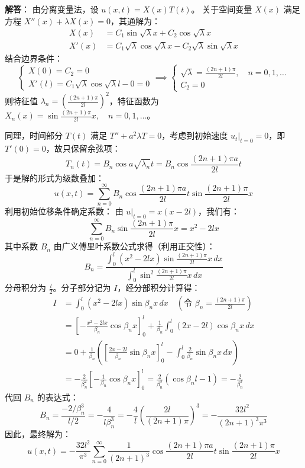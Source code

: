 \documentclass[12pt,a4paper]{ctexart}
\begin{document}
	\textbf{解答}：
	由分离变量法，设 $u(x,t) = X(x)T(t)$。
	关于空间变量 $X(x)$ 满足方程 $X''(x) + \lambda X(x) = 0$，其通解为：
	\begin{align*}
		X(x) &= C_1 \sin \sqrt{\lambda}x + C_2 \cos \sqrt{\lambda}x \\
		X'(x) &= C_1 \sqrt{\lambda} \cos \sqrt{\lambda}x - C_2 \sqrt{\lambda} \sin \sqrt{\lambda}x
	\end{align*}
	结合边界条件：
	\begin{equation}
		\begin{cases}
			X(0) = C_2 = 0 \\
			X'(l) = C_1 \sqrt{\lambda} \cos \sqrt{\lambda}l - 0 = 0
		\end{cases}
		\implies
		\begin{cases}
			\sqrt{\lambda} = \frac{(2n+1)\pi}{2l}, \quad n=0, 1, \dots \\
			C_2 = 0
		\end{cases}
	\end{equation}
	则特征值 $\lambda_n = \left(\frac{(2n+1)\pi}{2l}\right)^2$，特征函数为 $X_n(x) = \sin \frac{(2n+1)\pi}{2l}x, \quad n=0, 1, \dots$。
	
	同理，时间部分 $T(t)$ 满足 $T'' + a^2\lambda T = 0$，考虑到初始速度 $u_t|_{t=0} = 0$，即 $T'(0)=0$，故只保留余弦项：
	\[
	T_n(t) = B_n \cos a\sqrt{\lambda_n}t = B_n \cos \frac{(2n+1)\pi a}{2l}t
	\]
	于是解的形式为级数叠加：
	\[
	u(x, t) = \sum_{n=0}^{\infty} B_n \cos \frac{(2n+1)\pi a}{2l}t \sin \frac{(2n+1)\pi}{2l}x
	\]
	利用初始位移条件确定系数：
	由 $u|_{t=0} = x(x - 2l)$，我们有：
	\[
	\sum_{n=0}^{\infty} B_n \sin \frac{(2n+1)\pi}{2l}x = x^2 - 2lx
	\]
	其中系数 $B_n$ 由广义傅里叶系数公式求得（利用正交性）：
	\[
	B_n = \frac{\int_0^l (x^2-2lx) \sin \frac{(2n+1)\pi}{2l}x \, dx}{\int_0^l \sin^2 \frac{(2n+1)\pi}{2l}x \, dx}
	\]
	分母积分为 $\frac{l}{2}$。分子部分记为 $I$，经分部积分计算得：
	\begin{align*}
		I &= \int_0^l (x^2-2lx) \sin \beta_n x \, dx \quad (\text{令 } \beta_n = \frac{(2n+1)\pi}{2l}) \\
		&= \left[ -\frac{x^2-2lx}{\beta_n} \cos \beta_n x \right]_0^l + \frac{1}{\beta_n} \int_0^l (2x-2l) \cos \beta_n x \, dx \\
		&= 0 + \frac{1}{\beta_n} \left( \left[ \frac{2x-2l}{\beta_n} \sin \beta_n x \right]_0^l - \int_0^l \frac{2}{\beta_n} \sin \beta_n x \, dx \right) \\
		&= -\frac{2}{\beta_n^2} \left[ -\frac{1}{\beta_n} \cos \beta_n x \right]_0^l = \frac{2}{\beta_n^3} (\cos \beta_n l - 1) = -\frac{2}{\beta_n^3}
	\end{align*}
	代回 $B_n$ 的表达式：
	\[
	B_n = \frac{-2/\beta_n^3}{l/2} = -\frac{4}{l \beta_n^3} = -\frac{4}{l} \left( \frac{2l}{(2n+1)\pi} \right)^3 = -\frac{32l^2}{(2n+1)^3\pi^3}
	\]
	因此，最终解为：
	\begin{equation}
		u(x, t) = -\frac{32l^2}{\pi^3} \sum_{n=0}^{\infty} \frac{1}{(2n+1)^3} \cos \frac{(2n+1)\pi a}{2l}t \sin \frac{(2n+1)\pi}{2l}x
	\end{equation}
	
\end{document}
